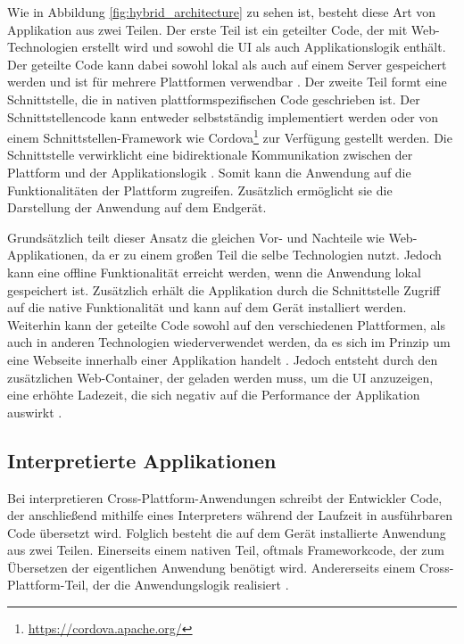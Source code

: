 Wie in Abbildung \ref{fig:hybrid_architecture} zu sehen ist, besteht diese Art von Applikation aus zwei Teilen.
Der erste Teil ist ein geteilter Code, der mit Web-Technologien erstellt wird und sowohl die UI als auch Applikationslogik enthält. Der geteilte Code kann dabei sowohl lokal als auch auf einem Server gespeichert werden und ist für mehrere Plattformen verwendbar \cite{2017hybrid_approach_end}.
Der zweite Teil formt eine Schnittstelle, die in nativen plattformspezifischen Code geschrieben ist. Der Schnittstellencode kann entweder selbstständig implementiert werden oder von einem Schnittstellen-Framework wie Cordova\footnote{\url{https://cordova.apache.org/}} zur Verfügung gestellt werden. Die Schnittstelle verwirklicht eine bidirektionale Kommunikation zwischen der Plattform und der Applikationslogik \cite{ELKASSAS2017163}. Somit kann die Anwendung auf die Funktionalitäten der Plattform zugreifen. Zusätzlich ermöglicht sie die Darstellung der Anwendung auf dem Endgerät. 

Grundsätzlich teilt dieser Ansatz die gleichen Vor- und Nachteile wie Web-Applikationen, da er zu einem großen Teil die selbe Technologien nutzt. Jedoch kann eine offline Funktionalität erreicht werden, wenn die Anwendung lokal gespeichert ist. Zusätzlich erhält die Applikation durch die Schnittstelle Zugriff auf die native Funktionalität und kann auf dem Gerät installiert werden. Weiterhin kann der geteilte Code sowohl auf den verschiedenen Plattformen, als auch in anderen Technologien wiederverwendet werden, da es sich im Prinzip um eine Webseite innerhalb einer Applikation handelt \cite{IEEE_development_classes}. Jedoch entsteht durch den zusätzlichen Web-Container, der geladen werden muss, um die UI anzuzeigen, eine erhöhte Ladezeit, die sich negativ auf die Performance der Applikation auswirkt \cite{IEEE_development_classes}.

\subsection{Interpretierte Applikationen}
\label{cha:3_2_interpretiert}
Bei interpretieren Cross-Plattform-Anwendungen schreibt der Entwickler Code, der anschließend mithilfe eines Interpreters während der Laufzeit in ausführbaren Code übersetzt wird. Folglich besteht die auf dem Gerät installierte Anwendung aus zwei Teilen. Einerseits einem nativen Teil, oftmals Frameworkcode, der zum Übersetzen der eigentlichen Anwendung benötigt wird. Andererseits einem Cross-Plattform-Teil, der die Anwendungslogik realisiert \cite{IEEE_development_classes}.

